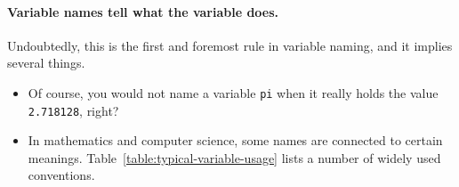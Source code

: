 \paragraph{Variable names tell what the variable does.}
Undoubtedly, this is the first and foremost rule in variable naming, and it
implies several things.

\begin{itemize}
\item Of course, you would not name a variable \lstinline!pi! when it really holds the value \lstinline!2.718128!, right?

\item In mathematics and computer science, some names are connected to certain
  meanings. Table~\ref{table:typical-variable-usage} lists a number of widely
  used conventions.


\end{itemize}
